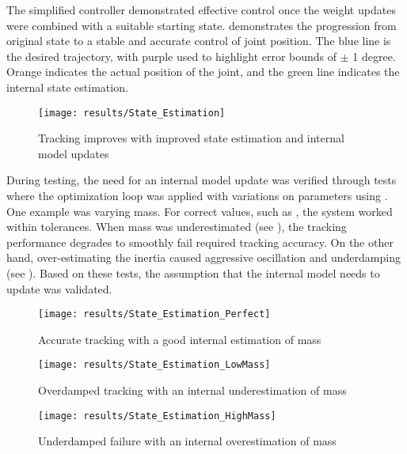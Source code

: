 
The simplified controller demonstrated effective control once the weight updates
were combined with a suitable starting state. 
demonstrates the progression from original state to a stable and accurate
control of joint position. The blue line is the desired trajectory, with purple
used to highlight error bounds of $\pm$ 1 degree. Orange indicates the actual
position of the joint, and the green line indicates the internal state
estimation.

\begin{figure}
\centering
\texttt{[image: results/State\_Estimation]}
\caption{Tracking improves with improved state estimation and internal model
updates}
\label{fig:SimplifiedTracking}
\end{figure}


During testing, the need for an internal model update was verified through 
tests where the optimization loop was applied with variations on 
parameters using . One example was varying mass. For correct values, such as 
, the system worked within tolerances. When 
mass was underestimated (see ), the tracking 
performance degrades to smoothly fail required tracking accuracy. On the other 
hand, over-estimating the inertia caused aggressive oscillation and underdamping (see ). Based on these tests, the assumption 
that the internal model needs to update was validated.

\begin{figure}
\centering
\texttt{[image: results/State\_Estimation\_Perfect]}
\caption{Accurate tracking with a good internal estimation of mass}
\label{fig:StateEstimationPerfect}
\end{figure}

\begin{figure}
\centering
\texttt{[image: results/State\_Estimation\_LowMass]}
\caption{Overdamped tracking with an internal underestimation of mass}
\label{fig:StateEstimationLowMass}
\end{figure}

\begin{figure}
\centering
\texttt{[image: results/State\_Estimation\_HighMass]}
\caption{Underdamped failure with an internal overestimation of mass}
\label{fig:StateEstimationHighMass}
\end{figure}

